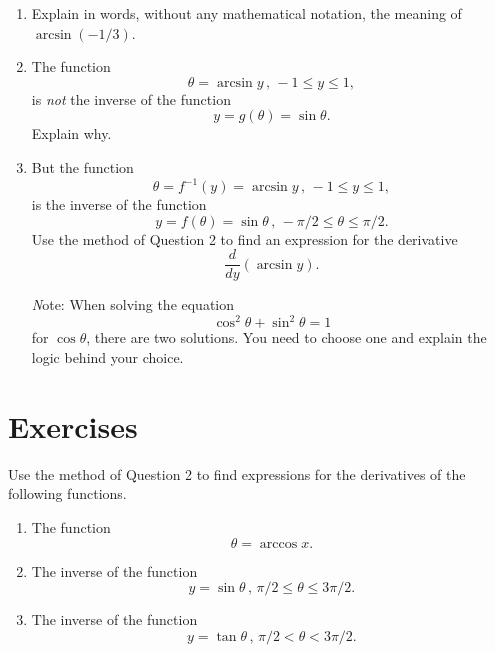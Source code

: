 \documentclass{ximera}
\begin{document}
\begin{question} \label{Qpfmvm20490}
\begin{enumerate}
\item Explain in words, without any mathematical notation, the meaning of $\arcsin (-1/3)$.

\item The function
\[
     \theta = \arcsin y \, , \, -1 \leq y \leq 1,
\]
is \emph{not} the inverse of the function
\[
  y = g(\theta) = \sin\theta.
\]
Explain why.
\begin{freeResponse}
\end{freeResponse}

\item But the function
\[
     \theta = f^{-1}(y) = \arcsin y \, , \, -1 \leq y \leq 1,
\]
is the inverse of the function
\[
  y = f(\theta) = \sin\theta \, , \, -\pi/2 \leq \theta \leq \pi/2.
\]
Use the method of Question 2 to find an expression for the derivative
\[
    \frac{d}{dy} \left( \arcsin y \right) .
\]

{\emph Note:} When solving the equation
\[
 \cos^2\theta + \sin^2 \theta = 1
\]
for $\cos\theta$, there are two solutions. You need to choose one and explain the logic behind your choice.
\end{enumerate}

\end{question}

\section{Exercises}

\begin{exercise} \label{Epvefm3130}
Use the method of Question 2 to find expressions for the derivatives of the following functions.

\begin{enumerate}
\item The function
\[
   \theta = \arccos x .
\]

\item The inverse of the function
\[
   y = \sin \theta \, , \, \pi/2 \leq \theta \leq 3\pi/2 .
\]

\item The inverse of the function
\[
  y = \tan\theta \, , \, \pi/2 < \theta < 3\pi/2 .
\]

\end{enumerate}
\end{exercise}
\end{document}
